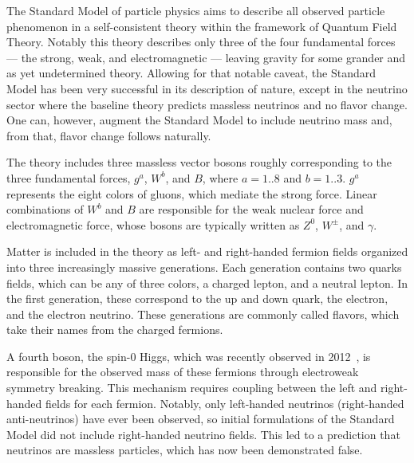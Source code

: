 The Standard Model of particle physics aims to describe all observed particle phenomenon in a self-consistent theory within the framework of Quantum Field Theory.
Notably this theory describes only three of the four fundamental forces --- the strong, weak, and electromagnetic --- leaving gravity for some grander and as yet undetermined theory. 
Allowing for that notable caveat, the Standard Model has been very successful in its description of nature, except in the neutrino sector where the baseline theory predicts massless neutrinos and no flavor change.
One can, however, augment the Standard Model to include neutrino mass and, from that, flavor change follows naturally.

The theory includes three massless vector bosons roughly corresponding to the three fundamental forces, $g^a$, $W^b$, and $B$, where $a=1..8$ and $b=1..3$.
$g^a$ represents the eight colors of gluons, which mediate the strong force.
Linear combinations of $W^b$ and $B$ are responsible for the weak nuclear force and electromagnetic force, whose bosons are typically written as $Z^0$, $W^{\pm}$, and $\gamma$.

Matter is included in the theory as left- and right-handed fermion fields organized into three increasingly massive generations.
Each generation contains two quarks fields, which can be any of three colors, a charged lepton, and a neutral lepton.
In the first generation, these correspond to the up and down quark, the electron, and the electron neutrino. 
These generations are commonly called flavors, which take their names from the charged fermions.

A fourth boson, the spin-0 Higgs, which was recently observed in 2012~\cite{higgs}, is responsible for the observed mass of these fermions through electroweak symmetry breaking.
This mechanism requires coupling between the left and right-handed fields for each fermion.
Notably, only left-handed neutrinos (right-handed anti-neutrinos) have ever been observed, so initial formulations of the Standard Model did not include right-handed neutrino fields.
This led to a prediction that neutrinos are massless particles, which has now been demonstrated false.

